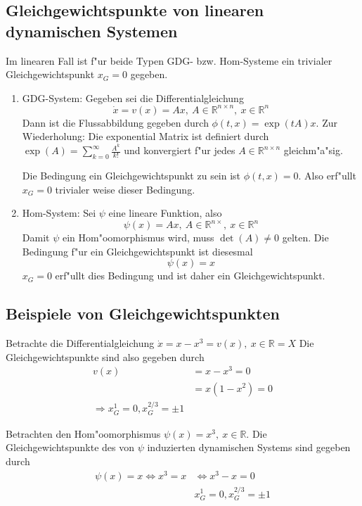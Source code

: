 \documentclass[a4paper, 13pt]{scrreprt}
\theoremstyle{definition} \newtheorem{definition}{Definition}[section]
\newenvironment{beispiel}[1][Beispiel]{\begin{trivlist}
\item[\hskip \labelsep {\bfseries #1}]}{\end{trivlist}}
\begin{document}
\subsection{Gleichgewichtspunkte von linearen dynamischen Systemen}
Im linearen Fall ist f"ur beide Typen GDG- bzw. Hom-Systeme ein trivialer Gleichgewichtspunkt $x_G = 0$ gegeben.
\begin{enumerate}
\item GDG-System: Gegeben sei die Differentialgleichung $$\dot x = v(x) = Ax, \ A \in \mathbb{R}^{n\times n}, \ x\in \mathbb{R}^n$$
Dann ist die Flussabbildung gegeben durch $\phi(t, x) = \exp{(tA)}x$. Zur Wiederholung: Die exponential Matrix ist definiert durch 
$\exp{(A)} = \sum_{k=0}^{\infty} \frac{A^k}{k!}$ und konvergiert f"ur jedes $A\in\mathbb{R}^{n\times n}$ gleichm"a"sig.

Die Bedingung ein Gleichgewichtspunkt zu sein ist $\phi(t, x) = 0$. Also erf"ullt $x_G = 0$ trivialer weise dieser Bedingung.

\item Hom-System: Sei $\psi$ eine lineare Funktion, also 
$$\psi( x) = Ax, \ A\in\mathbb{R}^{n \times }, \ x\in \mathbb{R}^n$$
Damit $\psi$ ein Hom"oomorphismus wird, muss $\det{(A)} \not = 0$ gelten. Die Bedingung f"ur ein Gleichgewichtspunkt ist diesesmal 
$$ \psi(x) = x $$
$x_G = 0$ erf"ullt dies Bedingung und ist daher ein Gleichgewichtspunkt.

\end{enumerate}

\subsection{Beispiele von Gleichgewichtspunkten}
\begin{beispiel}[Gleichgewichtspunkte des DGD-Systems]
Betrachte die Differentialgleichung $\dot x = x - x^3 = v(x), \ x \in \mathbb{R} = X$
Die Gleichgewichtspunkte sind also gegeben durch 
\begin{align*}
v(x) &= x - x^3 = 0 \\
& = x(1-x^2) = 0\\
\Rightarrow x_G^1 = 0, x_G^{2/3} = \pm 1
\end{align*}
\end{beispiel}

\begin{beispiel}[Gleichgewichtspunkte des Hom-Systems]
Betrachten den Hom"oomorphismus $\psi(x) = x^3,\ x\in \mathbb{R}$. Die Gleichgewichtspunkte des von $\psi$ induzierten dynamischen Systems sind gegeben durch
\begin{align*}
\psi(x) = x \Leftrightarrow x^3 = x &\Leftrightarrow x^3- x = 0\\
& x_G^1 = 0, x_G^{2/3} = \pm 1
\end{align*}

\end{beispiel}
\end{document}
